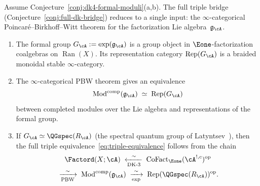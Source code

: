 \begin{conjecture}
\label{conj:dk5-infty-pbw}
Assume Conjecture~\textup{\ref{conj:dk4-formal-moduli}(a,b)}.
The full triple bridge
\textup{(}Conjecture~\textup{\ref{conj:full-dk-bridge}}\textup{)}
reduces to a single input: the $\infty$-categorical
Poincar\'e--Birkhoff--Witt theorem for the factorization Lie
algebra~$\mathfrak{g}_{\cA}$.
\begin{enumerate}[label=\textup{(\alph*)}]
\item The formal group
  $G_{\cA} := \exp(\mathfrak{g}_{\cA})$
  is a group object in $\Eone$-factorization coalgebras on
  $\operatorname{Ran}(X)$.  Its representation category
  $\operatorname{Rep}(G_{\cA})$ is a braided monoidal stable
  $\infty$-category.
\item The $\infty$-categorical PBW theorem gives an equivalence
  \[
  \operatorname{Mod}^{\mathrm{comp}}(\mathfrak{g}_{\cA})
  \;\simeq\;
  \operatorname{Rep}(G_{\cA})
  \]
  between completed modules over the Lie algebra and
  representations of the formal group.
\item If $G_{\cA} \simeq \QGspec(R_{\cA})$
  \textup{(}the spectral quantum group of
  Latyntsev~\cite{Latyntsev23}\textup{)}, then the full triple
  equivalence~\eqref{eq:triple-equivalence} follows from the chain
  \begin{multline*}
  \Factord(X;\cA)
  \;\xleftarrow[\textup{DK-3}]{\sim}\;
  \operatorname{CoFact}_{\Eone}(\cA^{!,c})^{\mathrm{op}}
  \\
  \;\xrightarrow[\textup{PBW}]{\sim}\;
  \operatorname{Mod}^{\mathrm{comp}}(\mathfrak{g}_{\cA})
  \;\xrightarrow[\exp]{\sim}\;
  \operatorname{Rep}(\QGspec(R_{\cA}))^{\mathrm{op}}.
  \end{multline*}
\end{enumerate}
\end{conjecture}

